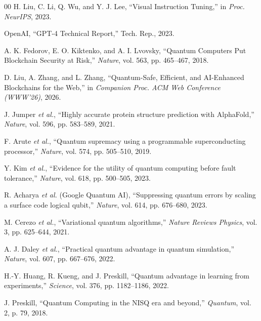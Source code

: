 \documentclass[conference]{IEEEtran}
\begin{document}
\begin{thebibliography}{00}
 H. Liu, C. Li, Q. Wu, and Y. J. Lee, ``Visual Instruction Tuning,'' in \textit{Proc. NeurIPS}, 2023.

 OpenAI, ``GPT-4 Technical Report,'' Tech. Rep., 2023.

 A. K. Fedorov, E. O. Kiktenko, and A. I. Lvovsky, ``Quantum Computers Put Blockchain Security at Risk,'' \textit{Nature}, vol. 563, pp. 465--467, 2018.

 D. Liu, A. Zhang, and L. Zhang, ``Quantum-Safe, Efficient, and AI-Enhanced Blockchains for the Web,'' in \textit{Companion Proc. ACM Web Conference (WWW'26)}, 2026.

 J. Jumper \textit{et al.}, ``Highly accurate protein structure prediction with AlphaFold,'' \textit{Nature}, vol. 596, pp. 583--589, 2021.

 F. Arute \textit{et al.}, ``Quantum supremacy using a programmable superconducting processor,'' \textit{Nature}, vol. 574, pp. 505--510, 2019.

 Y. Kim \textit{et al.}, ``Evidence for the utility of quantum computing before fault tolerance,'' \textit{Nature}, vol. 618, pp. 500--505, 2023.

 R. Acharya \textit{et al.} (Google Quantum AI), ``Suppressing quantum errors by scaling a surface code logical qubit,'' \textit{Nature}, vol. 614, pp. 676--680, 2023.

 M. Cerezo \textit{et al.}, ``Variational quantum algorithms,'' \textit{Nature Reviews Physics}, vol. 3, pp. 625--644, 2021.

 A. J. Daley \textit{et al.}, ``Practical quantum advantage in quantum simulation,'' \textit{Nature}, vol. 607, pp. 667--676, 2022.

 H.-Y. Huang, R. Kueng, and J. Preskill, ``Quantum advantage in learning from experiments,'' \textit{Science}, vol. 376, pp. 1182--1186, 2022.

 J. Preskill, ``Quantum Computing in the NISQ era and beyond,'' \textit{Quantum}, vol. 2, p. 79, 2018.

\end{thebibliography}
\end{document}
